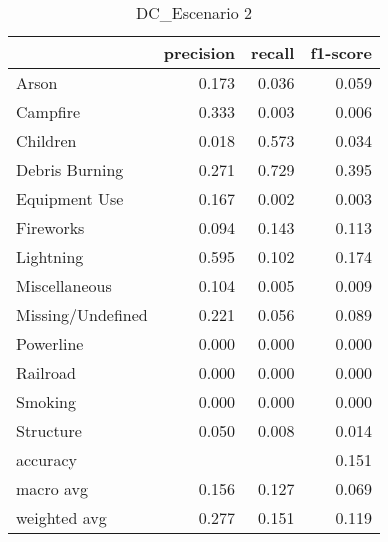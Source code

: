 \begin{table}
\centering
\caption{DC_Escenario 2}
\label{tab:Reporte de clasificación para el Escenario 2 utilizando Discriminante Cuadrático}
\begin{tabular}{lrrr}
\toprule
{} &  precision &  recall &  f1-score \\
\midrule
Arson             &      0.173 &   0.036 &     0.059 \\
Campfire          &      0.333 &   0.003 &     0.006 \\
Children          &      0.018 &   0.573 &     0.034 \\
Debris Burning    &      0.271 &   0.729 &     0.395 \\
Equipment Use     &      0.167 &   0.002 &     0.003 \\
Fireworks         &      0.094 &   0.143 &     0.113 \\
Lightning         &      0.595 &   0.102 &     0.174 \\
Miscellaneous     &      0.104 &   0.005 &     0.009 \\
Missing/Undefined &      0.221 &   0.056 &     0.089 \\
Powerline         &      0.000 &   0.000 &     0.000 \\
Railroad          &      0.000 &   0.000 &     0.000 \\
Smoking           &      0.000 &   0.000 &     0.000 \\
Structure         &      0.050 &   0.008 &     0.014 \\
accuracy          &            &         &     0.151 \\
macro avg         &      0.156 &   0.127 &     0.069 \\
weighted avg      &      0.277 &   0.151 &     0.119 \\
\bottomrule
\end{tabular}
\end{table}
